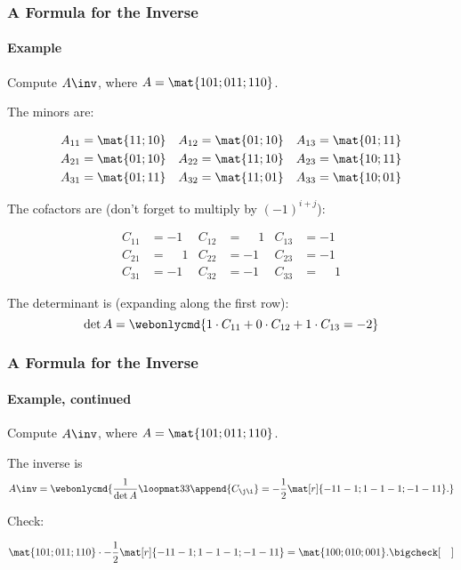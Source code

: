\begin{frame}
\frametitle{A Formula for the Inverse}
\framesubtitle{Example}

Compute $A\inv$, where
$A = \mat{1 0 1; 0 1 1; 1 1 0}$.

\pause
The minors are:
\begin{webonly}
\begin{align*}
  A_{11} &= \mat{1 1; 1 0} &
  A_{12} &= \mat{0 1; 1 0} &
  A_{13} &= \mat{0 1; 1 1} \\
  A_{21} &= \mat{0 1; 1 0} &
  A_{22} &= \mat{1 1; 1 0} &
  A_{23} &= \mat{1 0; 1 1} \\
  A_{31} &= \mat{0 1; 1 1} &
  A_{32} &= \mat{1 1; 0 1} &
  A_{33} &= \mat{1 0; 0 1}
\end{align*}
\end{webonly}
\pause
The cofactors are (don't forget to multiply by $(-1)^{i+j}$):
\begin{webonly}
\begin{align*}
  C_{11} &= -1  &  C_{12} &=  \phantom-1  &  C_{13} &= -1 \\
  C_{21} &= \phantom-1  &  C_{22} &= -1  &  C_{23} &= -1 \\
  C_{31} &= -1  &  C_{32} &= -1  &  C_{33} &=  \phantom-1
\end{align*}
\end{webonly}
\pause
The determinant is (expanding along the first row):
\[ \det A = \webonlycmd{1\cdot C_{11} + 0\cdot C_{12} + 1\cdot C_{13} = -2} \]

\end{frame}



\begin{frame}
\frametitle{A Formula for the Inverse}
\framesubtitle{Example, continued}

Compute $A\inv$, where
$A = \mat{1 0 1; 0 1 1; 1 1 0}$.

\pause
The inverse is
\[ A\inv = \webonlycmd{\frac 1{\det A}\loopmat33{\append{C_{\j\i}}}
= -\frac12\mat[r]{-1 1 -1; 1 -1 -1; -1 -1 1}.} \]

\pause
Check:
\begin{webonly}
\[ \mat{1 0 1; 0 1 1; 1 1 0}\cdot -\frac12\mat[r]{-1 1 -1; 1 -1 -1; -1 -1 1}
= \mat{1 0 0; 0 1 0; 0 0 1}. \bigcheck[\quad] \]
\end{webonly}

\end{frame}


